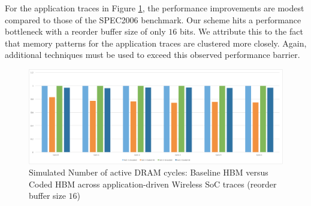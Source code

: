 %
%
%

For the application traces in Figure \ref{fig:lte_umts}, the performance improvements are modest compared to those of the SPEC2006 benchmark. Our scheme hits a performance bottleneck with a reorder buffer size of only $16$ bits. We attribute this to the fact that memory patterns for the application traces are clustered more closely. Again, additional techniques must be used to exceed this observed performance barrier. \\

\begin{figure}[htb] \centering
\includegraphics[width=0.75\linewidth]{figures/soc.pdf} 
\caption{Simulated Number of active DRAM cycles: Baseline HBM versus Coded HBM across application-driven Wireless SoC traces (reorder buffer size $16$) }
\label{fig:lte_umts}
\end{figure}

%
%


